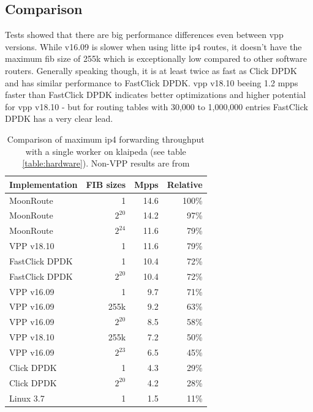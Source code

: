 

\subsection{Comparison}

Tests showed that there are big performance differences even between
\Ac{vpp} versions. While v16.09 is slower when using litte \Ac{ip4}
routes, it doesn't have the maximum \Ac{fib} size of 255k which is
exceptionally low compared to other software routers. Generally
speaking though, it is at least twice as fast as Click DPDK and has
similar performance to FastClick DPDK. \Ac{vpp} v18.10 beeing 1.2 mpps
faster than FastClick DPDK indicates better optimizations and higher
potential for \Ac{vpp} v18.10 - but for routing tables with 30,000 to
1,000,000 entries FastClick DPDK has a very clear lead.


\begin{table}[!ht]
	\vspace{5ex}
	\begin{tabular}[]{ l r r r }
		Implementation	 & FIB sizes & Mpps		& Relative \\ 
		\midrule
		MoonRoute		 & 1		 & 14.6		& 100\% \\
		MoonRoute		 & $2^{20}$	 & 14.2		& 97\% \\
		MoonRoute		 & $2^{24}$	 & 11.6		& 79\% \\
		VPP v18.10		 & 1		 & 11.6		& 79\% \\
		FastClick DPDK	 & 1		 & 10.4 	& 72\% \\
		FastClick DPDK	 & $2^{20}$	 & 10.4 	& 72\% \\
		VPP v16.09		 & 1		 & 9.7	 	& 71\% \\
		VPP v16.09		 & 255k		 & 9.2	 	& 63\% \\
		VPP v16.09		 & $2^{20}$	 & 8.5	 	& 58\% \\
		VPP v18.10		 & 255k		 & 7.2	 	& 50\% \\
		VPP v16.09		 & $2^{23}$	 & 6.5	 	& 45\% \\
		Click DPDK		 & 1		 & 4.3 		& 29\% \\
		Click DPDK		 & $2^{20}$	 & 4.2 		& 28\% \\
		Linux 3.7		 & 1		 & 1.5 		& 11\% \\

		\midrule
	\end{tabular}
	\caption{Comparison of maximum \Ac{ip4} forwarding throughput with a single worker on klaipeda (see table \ref{table:hardware}). Non-VPP results are from \cite{chair:architecture}}
	\label{table:comparison}
\end{table}


